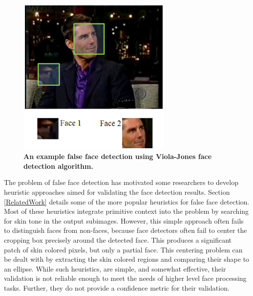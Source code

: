 \documentclass[times, 10pt,twocolumn]{article}
\begin{document}
\begin{figure}[h]
\centering
\includegraphics[width=3in]{Figure1.eps}
\caption{{\bf {\selectfont An example false face
detection using Viola-Jones \cite{viola_robust_2004} face detection
algorithm.}}} \label{Fig:ExampleFalseDetect}
\end{figure}

The problem of false face detection has motivated some researchers
to develop heuristic approaches aimed for validating the face
detection results. Section \ref{RelatedWork} details some of the
more popular heuristics for false face detection. Most of these
heuristics integrate primitive context into the problem by searching
for skin tone in the output subimages. However, this simple approach
often fails to distinguish faces from non-faces, because face
detectors often fail to center the cropping box precisely around the
detected face. This produces a significant patch of skin colored
pixels, but only a partial face. This centering problem can be dealt
with by extracting the skin colored regions and comparing their
shape to an ellipse. While such heuristics, are simple, and somewhat
effective, their validation is not reliable enough to meet the needs
of higher level face processing tasks. Further, they do not provide
a confidence metric for their validation.
\end{document}
